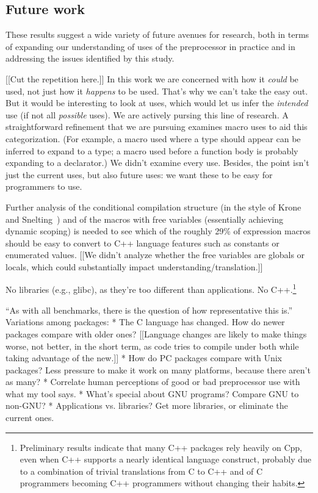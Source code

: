 \documentclass[10pt]{article}
\newcommand{\pkg}[1]{\textsf{#1}}
\begin{document}
\subsection{Future work}
 
These results suggest a wide variety of future avenues for research, both
in terms of expanding our understanding of uses of the preprocessor in
practice and in addressing the issues identified by this study.

[[Cut the repetition here.]]
In this work  we are concerned with how it {\em could} be used, not just how it {\em
  happens} to be used.  That's why we can't take the easy out.  But it
  would be interesting to look at uses, which would let us infer the {\em
  intended} use (if not all {\em possible} uses).  We are actively pursing
  this line of research.
A straightforward refinement that we are pursuing examines macro uses to
aid this categorization.  (For example, a macro used where a type should
appear can be inferred to expand to a type; a macro used before a function
body is probably expanding to a declarator.)
        We didn't examine every use.  Besides, the point isn't just the
          current uses, but also future uses:  we want these to be easy for
          programmers to use.

Further analysis of the conditional
compilation structure (in the style of Krone and Snelting~\cite{Krone94})
and of the macros with free variables (essentially achieving dynamic
scoping) is needed to see which of the roughly 29\% of expression macros
should be easy to convert to C++ language features such as constants or
enumerated values.
  [[We didn't analyze whether the free variables are globals or locals,
          which could substantially impact understanding/translation.]]


No libraries (e.g., \pkg{glibc}), as they're too different than applications.
No C++.\footnote{Preliminary results indicate that many
  C++ packages rely heavily on Cpp, even when C++ supports a nearly
  identical language construct, probably due to a combination of trivial
  translations from C to C++ and of C programmers becoming C++ programmers
  without changing their habits.}

``As with all benchmarks, there is the question of how representative this is.''
Variations among packages:
 * The C language has changed.  How do newer packages compare with older ones?
   [[Language changes are likely to make things worse, not better, in the
   short term, as code tries to compile under both while taking advantage
   of the new.]]
 * How do PC packages compare with Unix packages?  Less pressure to make it
   work on many platforms, because there aren't as many?
 * Correlate human perceptions of good or bad preprocessor use with what my
   tool says.
 * What's special about GNU programs?  Compare GNU to non-GNU?
 * Applications vs. libraries?  Get more libraries, or eliminate the current
   ones.
\end{document}
